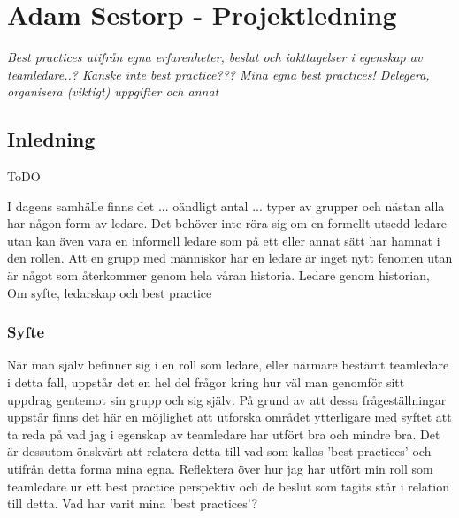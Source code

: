 \section{Adam Sestorp - Projektledning}
\emph{Best practices utifrån egna erfarenheter, beslut och iakttagelser i egenskap av teamledare..?
\newline \newline
Kanske inte best practice??? Mina egna best practices! Delegera, organisera (viktigt) uppgifter och annat}

\subsection{Inledning}
ToDO

I dagens samhälle finns det ... oändligt antal ... typer av grupper och nästan alla har någon form av ledare. Det behöver inte röra sig om en formellt utsedd ledare utan kan även vara en informell ledare som på ett eller annat sätt har hamnat i den rollen. Att en grupp med människor har en ledare är inget nytt fenomen utan är något som återkommer genom hela våran historia. 
\newline \newline
Ledare genom historian, Om syfte, ledarskap och best practice

\subsubsection{Syfte}
När man själv befinner sig i en roll som ledare, eller närmare bestämt teamledare i detta fall, uppstår det en hel del frågor kring hur väl man genomför sitt uppdrag gentemot sin grupp och sig själv. På grund av att dessa frågeställningar uppstår finns det här en möjlighet att utforska området ytterligare med syftet att ta reda på vad jag i egenskap av teamledare har utfört bra och mindre bra. Det är dessutom önskvärt att relatera detta till vad som kallas 'best practices' och utifrån detta forma mina egna.
\newline \newline
Reflektera över hur jag har utfört min roll som teamledare ur ett best practice perspektiv och de beslut som tagits står i relation till detta. Vad har varit mina 'best practices'?

